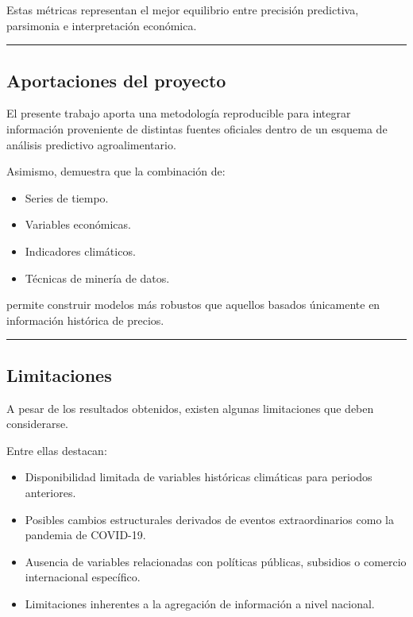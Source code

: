 \documentclass[11pt]{article}
\providecommand{\tightlist}{%
      \setlength{\itemsep}{0pt}\setlength{\parskip}{0pt}}
\begin{document}
Estas métricas representan el mejor equilibrio entre precisión
predictiva, parsimonia e interpretación económica.

\begin{center}\rule{0.5\linewidth}{0.5pt}\end{center}

\hypertarget{aportaciones-del-proyecto}{%
\subsection{Aportaciones del proyecto}\label{aportaciones-del-proyecto}}

El presente trabajo aporta una metodología reproducible para integrar
información proveniente de distintas fuentes oficiales dentro de un
esquema de análisis predictivo agroalimentario.

Asimismo, demuestra que la combinación de:

\begin{itemize}
\tightlist
\item
  Series de tiempo.
\item
  Variables económicas.
\item
  Indicadores climáticos.
\item
  Técnicas de minería de datos.
\end{itemize}

permite construir modelos más robustos que aquellos basados únicamente
en información histórica de precios.

\begin{center}\rule{0.5\linewidth}{0.5pt}\end{center}

\hypertarget{limitaciones}{%
\subsection{Limitaciones}\label{limitaciones}}

A pesar de los resultados obtenidos, existen algunas limitaciones que
deben considerarse.

Entre ellas destacan:

\begin{itemize}
\tightlist
\item
  Disponibilidad limitada de variables históricas climáticas para
  periodos anteriores.
\item
  Posibles cambios estructurales derivados de eventos extraordinarios
  como la pandemia de COVID-19.
\item
  Ausencia de variables relacionadas con políticas públicas, subsidios o
  comercio internacional específico.
\item
  Limitaciones inherentes a la agregación de información a nivel
  nacional.
\end{itemize}
\end{document}
